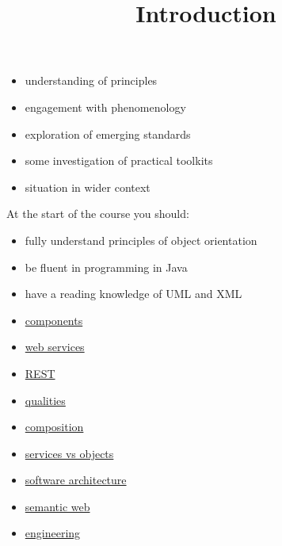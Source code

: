 \documentclass{sepslide-soa-faked} %
\title{Introduction}
\begin{document}
\begin{slide}
  \Title
\end{slide}

\begin{slide}
  \Contents
\end{slide}

\begin{slide}
\begin{itemize}
\item understanding of principles
\item engagement with phenomenology
\item exploration  of emerging standards
\item some investigation of practical toolkits
\item situation in wider context
\end{itemize}
\end{slide}

\begin{slide}
At the start of the course you should:
\begin{itemize}
\item fully understand principles of object orientation
\item be fluent in programming in Java 
\item have a reading knowledge of UML and XML
\end{itemize}
\end{slide}

\begin{slide}
\begin{itemize}
\item \href{01-components.pdf}{components}
\item \href{02-web.pdf}{web services}
\item \href{03-rest.pdf}{REST}
\item \href{04-qualities.pdf}{qualities} %
\item \href{05-composition.pdf}{composition}
\item \href{06-objects.pdf}{services vs objects} %
\item \href{06-architecture.pdf}{software architecture} %
\item \href{08-semantic.pdf}{semantic web}
\item \href{09-engineering.pdf}{engineering} %
\end{itemize}
\end{slide}
\end{document}
